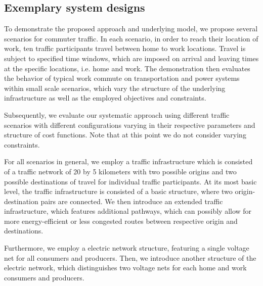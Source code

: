 \subsection{Exemplary system designs}
\label{examples}

To demonstrate the proposed approach and underlying model, we propose several scenarios for commuter traffic. In each scenario, in order to reach their location of work, ten traffic participants travel between home to work locations. Travel is subject to specified time windows, which are imposed on arrival and leaving times at the specific locations, i.e. home and work. The demonstration then evaluates the behavior of typical work commute on transportation and power systems within small scale scenarios, which vary the structure of the underlying infrastructure as well as the employed objectives and constraints.

Subsequently, we evaluate our systematic approach using different traffic scenarios with different configurations varying in their respective parameters and structure of cost functions. Note that at this point we do not consider varying constraints. 



For all scenarios in general, we employ a traffic infrastructure which is consisted of a traffic network of 20 by 5 kilometers with two possible origins and two possible destinations of travel for individual traffic participants. At its most basic level, the traffic infrastructure is consisted of a basic structure, where two origin-destination pairs are connected. We then introduce an extended traffic infrastructure, which features additional pathways, which can possibly allow for more energy-efficient or less congested routes between respective origin and destinations.

Furthermore, we employ a electric network structure, featuring a single voltage net for all consumers and producers. Then, we introduce another structure of the electric network, which distinguishes two voltage nets for each home and work consumers and producers.


